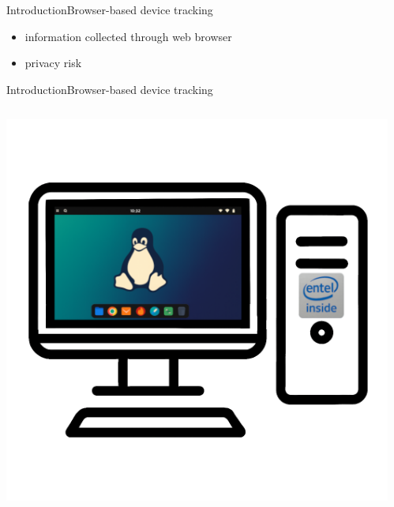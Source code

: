 \documentclass[aspectratio=169, hyperref={colorlinks=true, allcolors=SecondaryColor}, c]{beamer}
\begin{document}
\begin{frame}[fragile]{Introduction}{Browser-based device tracking}
\begin{transformation}
\begin{adjustbox}{scale=1}
\begin{minipage}{1\textwidth}
			\end{minipage}
		\end{adjustbox}
	\end{transformation}
	\vspace{-0.5cm}
	\begin{itemize}
		\item information collected through web browser
		\item privacy risk
	\end{itemize}
\end{frame}

\begin{frame}[fragile]{Introduction}{Browser-based device tracking}
	\begin{columns}
		\begin{column}{0.33\textwidth}
			\includegraphics[width=1\textwidth]{./figures/computer_alpha_screen_2_golden.png}
		\end{column}
		\begin{column}{0.33\textwidth}

\end{column}
\end{columns}
\end{frame}
\end{document}
